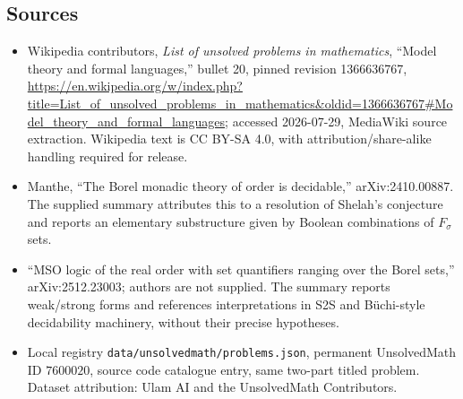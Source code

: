 \documentclass[11pt]{article}
\begin{document}
\subsection{Sources}
\begin{itemize}
\item Wikipedia contributors, \emph{List of unsolved problems in mathematics}, ``Model theory and formal languages,'' bullet 20, pinned revision 1366636767, \url{https://en.wikipedia.org/w/index.php?title=List_of_unsolved_problems_in_mathematics&oldid=1366636767#Model_theory_and_formal_languages}; accessed 2026-07-29, MediaWiki source extraction. Wikipedia text is CC BY-SA 4.0, with attribution/share-alike handling required for release.
\item Manthe, ``The Borel monadic theory of order is decidable,'' arXiv:2410.00887. The supplied summary attributes this to a resolution of Shelah's conjecture and reports an elementary substructure given by Boolean combinations of $F_\sigma$ sets.
\item ``MSO logic of the real order with set quantifiers ranging over the Borel sets,'' arXiv:2512.23003; authors are not supplied. The summary reports weak/strong forms and references interpretations in S2S and B\"uchi-style decidability machinery, without their precise hypotheses.
\item Local registry \texttt{data/unsolvedmath/problems.json}, permanent UnsolvedMath ID $7600020$, source code catalogue entry, same two-part titled problem. Dataset attribution: Ulam AI and the UnsolvedMath Contributors.
\end{itemize}
\end{document}
